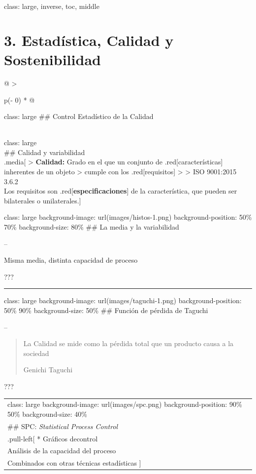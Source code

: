 \documentclass[
]{book}
\begin{document}
class: large, inverse, toc, middle

\hypertarget{estaduxedstica-calidad-y-sostenibilidad}{%
\section{3. Estadística, Calidad y Sostenibilidad}\label{estaduxedstica-calidad-y-sostenibilidad}}

\begin{longtable}[]{@{}
  >{\raggedright\arraybackslash}p{(\columnwidth - 0\tabcolsep) * }@{}}
\toprule
\begin{minipage}[b]{\linewidth}\raggedright
class: large
\#\# Control Estadístico de la Calidad
\end{minipage} \\
\midrule
\endhead
class: large \\
\#\# Calidad y variabilidad \\
.media{[}
\textgreater{} \textbf{Calidad:} Grado en el que un conjunto de .red{[}características{]} inherentes de un objeto
\textgreater{} cumple con los .red{[}requisitos{]}
\textgreater{}
\textgreater{} ISO 9001:2015 3.6.2 \\
Los requisitos son .red{[}\textbf{especificaciones}{]} de la característica, que pueden ser bilaterales o unilaterales.{]} \\
\bottomrule
\end{longtable}

class: large
background-image: url(images/histos-1.png)
background-position: 50\% 70\%
background-size: 80\%
\#\# La media y la variabilidad

--

Misma media, distinta capacidad de proceso

???

\begin{center}\rule{0.5\linewidth}{0.5pt}\end{center}

class: large
background-image: url(images/taguchi-1.png)
background-position: 50\% 90\%
background-size: 50\%
\#\# Función de pérdida de Taguchi

--

\begin{quote}
La Calidad se mide como la pérdida total que un producto causa a la sociedad

Genichi Taguchi
\end{quote}

???

\begin{longtable}[]{@{}
  >{\raggedright\arraybackslash}p{}@{}}
\toprule
\endhead
class: large
background-image: url(images/spc.png)
background-position: 90\% 50\%
background-size: 40\% \\
\#\# SPC: \emph{Statistical Process Control} \\
.pull-left{[}
* Gráficos decontrol \\
* Análisis de la capacidad del proceso \\
* Combinados con otras técnicas estadísticas
{]} \\
\bottomrule
\end{longtable}
\end{document}
